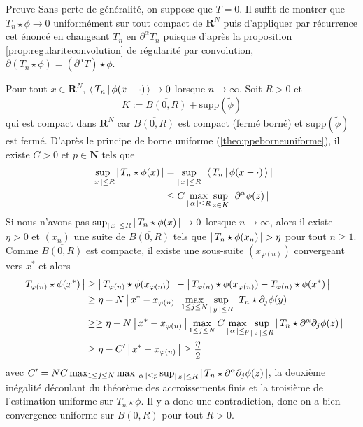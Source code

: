         \begin{demo}{Preuve}
            Sans perte de généralité, on suppose que $T = 0$. Il suffit de montrer que $T_n \star \phi \to 0$ uniformément sur tout compact de $\mathbf{R}^N$ puis d’appliquer par récurrence cet énoncé en changeant $T_n$ en $\partial^{\alpha} T_n$ puisque d’après la proposition \ref{prop:regulariteconvolution} de régularité par convolution, $\partial (T_n \star \phi) = (\partial^{\alpha} T) \star \phi$.

            Pour tout $x \in \mathbf{R}^N$, $\left< \, T_n \, \middle| \, \phi(x - \cdot) \, \right> \to 0$ lorsque $n \to \infty$. Soit $R > 0$ et 
            \[ K:= \overline{B(0,R)} + \text{supp}(\tilde{\phi}) \]   
            qui est compact dans $\mathbf{R}^N$ car $\overline{B(0,R)}$ est compact (fermé borné) et $\text{supp}(\tilde{\phi})$ est fermé. D’après le principe de borne uniforme (\ref{theo:ppeborneuniforme}), il existe $C > 0$ et $p \in \mathbf{N}$ tels que 
            \begin{align*}
                \sup_{\left\lvert \, x \, \right\rvert \leq R} \left\lvert \, T_n \star \phi(x) \, \right\rvert 
                &= \sup_{\left\lvert \, x \, \right\rvert \leq R} \left\lvert \, \left< \, T_n \, \middle| \, \phi(x - \cdot) \, \right> \, \right\rvert \\
                &\leq C \max_{\left\lvert \, \alpha \, \right\rvert \leq R} \sup_{z \in K} \left\lvert \, \partial^{\alpha} \phi(z) \, \right\rvert 
            \end{align*}
            Si nous n’avons pas $\sup_{\left\lvert \, x \, \right\rvert \leq R} \left\lvert \, T_n \star \phi(x) \, \right\rvert \to 0$ lorsque $n \to \infty$, alors il existe $\eta > 0$ et $(x_n)$ une suite de $\overline{B(0,R)}$ tels que $\left\lvert \, T_n \star \phi(x_n) \, \right\rvert > \eta$ pour tout $n \geq 1$. Comme $\overline{B(0,R)}$ est compacte, il existe une sous-suite $(x_{\varphi(n)})$ convergeant vers $x^*$ et alors
            \begin{align*}
                \left\lvert \, T_{\varphi(n)} \star \phi(x^*) \, \right\rvert 
                &\geq \left\lvert \, T_{\varphi(n)} \star \phi(x_{\varphi(n)}) \, \right\rvert - \left\lvert \, T_{\varphi(n)} \star \phi(x_{\varphi(n)}) - T_{\varphi(n)} \star \phi(x^*) \, \right\rvert \\
                &\geq \eta - N \left\lvert \, x^* - x_{\varphi(n)} \, \right\rvert \max_{1 \leq j \leq N} \sup_{\left\lvert \, y \, \right\rvert \leq R} \left\lvert \, T_n \star \partial_j \phi(y) \, \right\rvert \\ 
                &\geq \geq \eta - N \left\lvert \, x^* - x_{\varphi(n)} \, \right\rvert \max_{1 \leq j \leq N} C \max_{\left\lvert \, \alpha \, \right\rvert \leq p} \sup_{\left\lvert \, z \, \right\rvert \leq R} \left\lvert \, T_n \star \partial^{\alpha}\partial_j \phi(z) \, \right\rvert \\
                &\geq \eta - C' \left\lvert \, x^* - x_{\varphi(n)} \, \right\rvert \geq \frac{\eta}{2}
            \end{align*}
            avec $C' = NC \max_{1 \leq j \leq N} \max_{\left\lvert \, \alpha \, \right\rvert \leq p} \sup_{\left\lvert \, z \, \right\rvert \leq R} \left\lvert \, T_n \star \partial^{\alpha}\partial_j \phi(z) \, \right\rvert$, la deuxième inégalité découlant du théorème des accroissements finis et la troisième de l’estimation uniforme sur $T_n \star \phi$. Il y a donc une contradiction, donc on a bien convergence uniforme sur $\overline{B(0,R)}$ pour tout $R > 0$.
        \end{demo}

